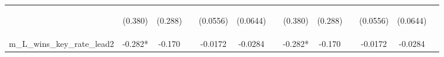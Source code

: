 \documentclass[]{article}
\begin{document}
\begin{center}
\begin{tabular}{lcccccccccccc}
\vspace{4pt} & \begin{footnotesize}(0.380)\end{footnotesize} & \begin{footnotesize}(0.288)\end{footnotesize} & \begin{footnotesize}\end{footnotesize} & \begin{footnotesize}(0.0556)\end{footnotesize} & \begin{footnotesize}(0.0644)\end{footnotesize} & \begin{footnotesize}\end{footnotesize} & \begin{footnotesize}(0.380)\end{footnotesize} & \begin{footnotesize}(0.288)\end{footnotesize} & \begin{footnotesize}\end{footnotesize} & \begin{footnotesize}(0.0556)\end{footnotesize} & \begin{footnotesize}(0.0644)\end{footnotesize} & \begin{footnotesize}\end{footnotesize} \\
m\_L\_wins\_key\_rate\_lead2 & -0.282* & -0.170 &  & -0.0172 & -0.0284 &  & -0.282* & -0.170 &  & -0.0172 & -0.0284 &  \\

\end{tabular}
\end{center}
\end{document}
